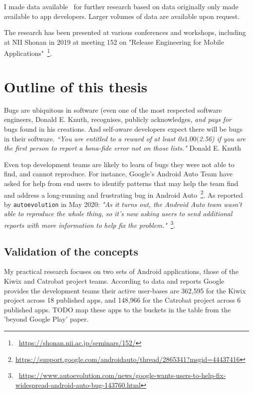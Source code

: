 I made data available~\cite{harty_wama_dataset_examples} for further research based on data originally only made available to app developers. Larger volumes of data are available upon request.

The research has been presented at various conferences and workshops, including at NII Shonan in 2019 at meeting 152 on "Release Engineering for Mobile Applications"~\footnote{~\url{https://shonan.nii.ac.jp/seminars/152/}}. 

\section{Outline of this thesis}
Bugs are ubiquitous in software (even one of the most respected software engineers, Donald E. Knuth, recognises, publicly acknowledges, \emph{and pays for}~\cite{knuth_trutex, wikipedia__knuth_reward_checks_2020} bugs found in his creations. And self-aware developers expect there will be bugs in their software. \emph{``You are entitled to a reward of at least 0x$1.00 ($2.56) if you are the first person to report a bona-fide error not on those lists."} Donald E. Knuth~\cite{knuth_the_bank_of_san_serriffe}

Even top development teams are likely to learn of bugs they were not able to find, and cannot reproduce. For instance, Google's Android Auto Team have asked for help from end users to identify patterns that may help the team find and address a long-running and frustrating bug in Android Auto~\footnote{\url{https://support.google.com/androidauto/thread/2865341?msgid=44437416}}. As reported by \texttt{autoevolution} in May 2020:  
\emph{"As it turns out, the Android Auto team wasn’t able to reproduce the whole thing, so it’s now asking users to send additional reports with more information to help fix the problem."}~\footnote{~\url{https://www.autoevolution.com/news/google-wants-users-to-help-fix-widespread-android-auto-bug-143760.html}}.


\subsection{Validation of the concepts}
My practical research focuses on two sets of Android applications, those of the Kiwix and Catrobat project teams. According to data and reports Google provides the development teams their active user-bases are 362,595 for the Kiwix project across 18 published apps, and 148,966 for the Catrobat project across 6 published apps. %
TODO map these apps to the buckets in the table from the 'beyond Google Play' paper.

